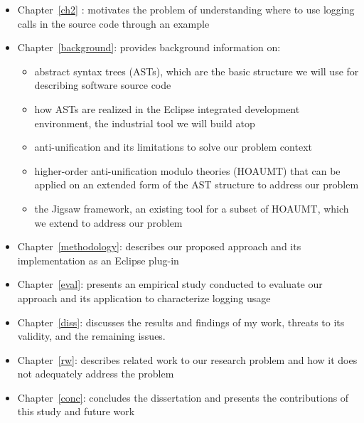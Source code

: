 \begin{itemize} [leftmargin=.01in]
\section{Thesis Organization} \label{intro-org}
\item Chapter~\ref{ch2} : motivates the problem of understanding where to use logging calls in the source code through an example%
\item Chapter~\ref{background}: provides background information on:
\begin{itemize} [leftmargin=.3in]
\item abstract syntax trees (ASTs), which are the basic structure we will use for describing software source code
\item how ASTs are realized in the Eclipse integrated development environment, the industrial tool we will build atop
\item anti-unification and its limitations to solve our problem context
\item higher-order anti-unification modulo theories (HOAUMT) that can be applied on an extended form of the AST structure to address our problem
\item the Jigsaw framework, an existing tool for a subset of HOAUMT, which we extend to address our problem
\end{itemize}
\item Chapter~\ref{methodology}: describes our proposed approach and its implementation as an Eclipse plug-in
\item Chapter~\ref{eval}: presents an empirical study conducted to evaluate our approach and its application to characterize logging usage
\item Chapter~\ref{diss}: discusses the results and findings of my work, threats to its validity, and the remaining issues.
\item Chapter~\ref{rw}: describes related work to our research problem and how it does not adequately address the problem
\item Chapter~\ref{conc}: concludes the dissertation and presents the contributions of this study and future work

\end{itemize}